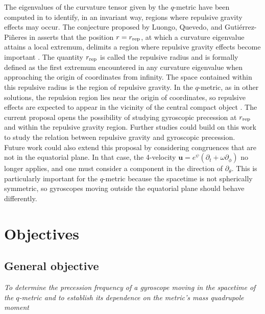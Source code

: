 \documentclass[12pt]{article}
\newcommand{\mbi}[1]{\boldsymbol{#1}}    %
\begin{document}
The eigenvalues of the curvature tensor given by the $q$-metric have been computed in \cite{arrieta2021shadows} to identify, in an invariant way, regions where repulsive gravity effects may occur. The conjecture proposed by Luongo, Quevedo, and Gutiérrez-Piñeres in \cite{luongo2014characterizing, gutierrez2019c} asserts that the position $r=r_{\rm rep}$, at which a curvature eigenvalue attains a local extremum, delimits a region where repulsive gravity effects become important \cite{luongo2014characterizing}. The quantity $r_{\rm rep}$ is called the repulsive radius and is formally defined as the first extremum encountered in any curvature eigenvalue when approaching the origin of coordinates from infinity. The space contained within this repulsive radius is the region of repulsive gravity. In the $q$-metric, as in other solutions, the repulsion region lies near the origin of coordinates, so repulsive effects are expected to appear in the vicinity of the central compact object \cite{gutierrez2019c}. The current proposal opens the possibility of studying gyroscopic precession at $r_{\rm rep}$ and within the repulsive gravity region. Further studies could build on this work to study the relation between repulsive gravity and gyroscopic precession.\\

Future work could also extend this proposal by considering congruences that are not in the equatorial plane. In that case, the 4-velocity $\mbi{u}=e^{\psi}(\partial_t+\omega\partial_\phi)$ no longer applies, and one must consider a component in the direction of $\partial_\theta$. This is particularly important for the $q$-metric because the spacetime is not spherically symmetric, so gyroscopes moving outside the equatorial plane should behave differently.




\section{Objectives}
\subsection{General objective}
{\it To determine the precession frequency of a gyroscope moving in the spacetime of the $q$-metric and to establish its dependence on the metric's mass quadrupole moment}
\end{document}
